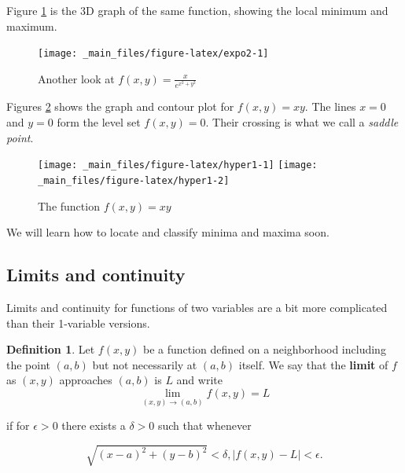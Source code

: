 \documentclass[
]{book}
\theoremstyle{definition}
\newtheorem{definition}{Definition}[chapter]
\theoremstyle{definition}
\theoremstyle{definition}
\theoremstyle{definition}
\theoremstyle{remark}
\begin{document}
Figure \ref{fig:expo2} is the 3D graph of the same function, showing the local minimum and maximum.

\begin{figure}

{\centering \texttt{[image: \_main\_files/figure-latex/expo2-1]} 

}

\caption{Another look at $f(x,y)=\frac{x}{e^{x^2+y^2}}$}\label{fig:expo2}
\end{figure}

Figures \ref{fig:hyper1} shows the graph and contour plot for \(f(x,y)=xy\). The lines \(x=0\) and \(y=0\) form the level set \(f(x,y)=0\). Their crossing is what we call a \emph{saddle point}.

\begin{figure}

{\centering \texttt{[image: \_main\_files/figure-latex/hyper1-1]} \texttt{[image: \_main\_files/figure-latex/hyper1-2]} 

}

\caption{The function $f(x,y)=xy$}\label{fig:hyper1}
\end{figure}

We will learn how to locate and classify minima and maxima soon.

\subsection*{Limits and continuity}\label{limits-and-continuity}

Limits and continuity for functions of two variables are a bit more complicated than their 1-variable versions.

\begin{defbox}

\begin{definition}
Let \(f(x,y)\) be a function defined on a neighborhood including the point \((a,b)\) but not necessarily at \((a,b)\) itself. We say that the \textbf{limit} of \(f\) as \((x,y)\) approaches \((a,b)\) is \(L\) and write
\[\lim_{(x,y)\to(a,b)}f(x,y)=L\]

if for \(\epsilon>0\) there exists a \(\delta>0\) such that whenever

\[\sqrt{(x-a)^2+(y-b)^2}<\delta,|f(x,y)-L|<\epsilon.\]
\end{definition}

\end{defbox}
\end{document}
